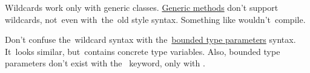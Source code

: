 \note Wildcards work only with generic classes.
\hyperref[javagenericmethod]{Generic methods} don't support wildcards, not~even with~the~old style syntax.
Something like  wouldn't~compile.

\warning Don't confuse the~wildcard syntax with the~\hyperref[javagenericsbound]{bounded type parameters} syntax.
It~looks similar, but~contains concrete type variables.
Also, bounded type parameters don't exist with \mbox{the } keyword, only with .
